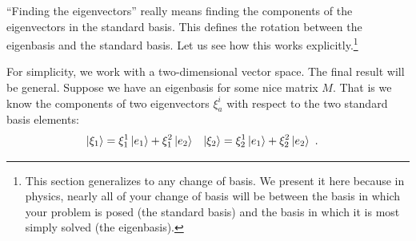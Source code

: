 \documentclass[12pt, oneside]{report}    %
\begin{document}
``Finding the eigenvectors'' really means finding the components of the eigenvectors in the standard basis. This defines the rotation between the eigenbasis and the standard basis. Let us see how this works explicitly.\footnote{This section generalizes to any change of basis. We present it here because in physics, nearly all of your change of basis will be between the basis in which your problem is posed (the standard basis) and the basis in which it is most simply solved (the eigenbasis).}

For simplicity, we work with a two-dimensional vector space. The final result will be general. Suppose we have an eigenbasis for some nice matrix $M$. That is we know the components of two eigenvectors $\xi^i_{a}$ with respect to the two standard basis elements:
\begin{align}
    \left|\xi_1\right\rangle 
    & = 
    \xi^1_1 \left|e_1\right\rangle
    +
    \xi^2_1 \left|e_2\right\rangle
    &
    \left|\xi_2\right\rangle 
    & = 
    \xi^1_2 \left|e_1\right\rangle
    +
    \xi^2_2 \left|e_2\right\rangle \ .
    \label{eq:eigen:to:standard:basis}
\end{align}
\end{document}
